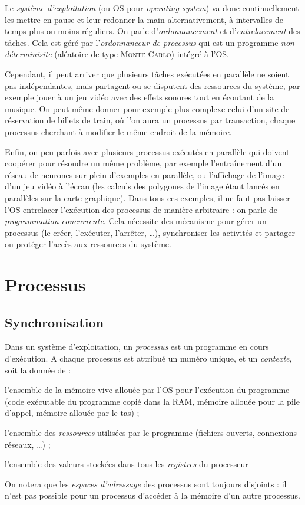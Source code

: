 \documentclass[a4paper,french,bookmarks]{book}
\newcommand{\chaptertoc}[0]{
    \begin{tcolorbox}[
        enhanced,
        frame hidden,
        sharp corners,
        detach title,
        spread outwards     = 5pt,
        halign              = center,
        valign              = center,
        borderline west     = {3pt}{0pt}{main20!50!main2!95!gray!90},
        coltitle            = main20!50!main2!95!gray!90, 
        interior style      = {
            left color      = main1white2!65!gray!11,
            middle color    = main1white2!50!gray!10,
            right color     = main1white2!35!gray!9
        },
        arc                 = 0 cm,
        title               = SOMMAIRE,
        boxrule             = 0pt,
        fonttitle           = \bfseries\sffamily,
        overlay             = {
            \node[rotate=90, minimum width=1cm, anchor=south,yshift=-0.8cm]
            at (frame.west) {\tcbtitle};
        }
    ]
        \begin{minipage}{0.83\linewidth}
            \sffamily
            \minitoc
        \end{minipage}
    \end{tcolorbox}
}
\begin{document}
    Le \emph{système d'exploitation} (ou OS pour \emph{operating system}) va donc continuellement les mettre en pause et leur redonner la main alternativement, à intervalles de temps plus ou moins réguliers. On parle d'\emph{ordonnancement} et d'\emph{entrelacement} des tâches. Cela est géré par l'\emph{ordonnanceur de processus} qui est un programme \emph{non déterminisite} (aléatoire de type \textsc{Monte-Carlo}) intégré à l'OS.\medskip
    
    Cependant, il peut arriver que plusieurs tâches exécutées en parallèle ne soient pas indépendantes, mais partagent ou se disputent des ressources du système, par exemple jouer à un jeu vidéo avec des effets sonores tout en écoutant de la musique. On peut même donner pour exemple plus complexe celui d'un site de réservation de billets de train, où l'on aura un processus par transaction, chaque processus cherchant à modifier le même endroit de la mémoire.\medskip
    
    Enfin, on peu parfois avec plusieurs processus exécutés en parallèle qui doivent coopérer pour résoudre un même problème, par exemple l'entraînement d'un réseau de neurones sur plein d'exemples en parallèle, ou l'affichage de l'image d'un jeu vidéo à l'écran (les calculs des polygones de l'image étant lancés en parallèles sur la carte graphique). Dans tous ces exemples, il ne faut pas laisser l'OS entrelacer l'exécution des processus de manière arbitraire : on parle de \emph{programmation concurrente}. Cela nécessite des mécanisme pour gérer un processus (le créer, l'exécuter, l'arrêter, \dots), synchroniser les activités et partager ou protéger l'accès aux ressources du système.

    \chaptertoc{}
    
    \section{Processus}
    
    \subsection{Synchronisation}
    
    Dans un système d'exploitation, un \emph{processus} est un programme en cours d'exécution. A chaque processus est attribué un numéro unique, et un \emph{contexte}, soit la donnée de :
    \begin{enumerate}
        \itt l'ensemble de la mémoire vive allouée par l'OS pour l'exécution du programme (code exécutable du programme copié dans la RAM, mémoire allouée pour la pile d'appel, mémoire allouée par le tas) ;
        
        \itt l'ensemble des \emph{ressources} utilisées par le programme (fichiers ouverts, connexions réseaux, \dots) ;
        
        \itt l'ensemble des valeurs stockées dans tous les \emph{registres} du processeur
    \end{enumerate}
    On notera que les \emph{espaces d'adressage} des processus sont toujours disjoints : il n'est pas possible pour un processus d'accéder à la mémoire d'un autre processus.


    
\end{document}
